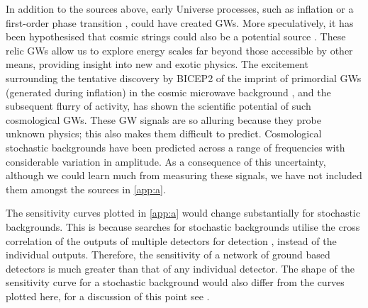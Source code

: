 In addition to the sources above, early Universe processes, such as inflation \citep{Grishchuk2005} or a first-order phase transition \citep{Binetruy2012}, could have created GWs. More speculatively, it has been hypothesised that cosmic strings could also be a potential source \citep{Damour2005,Binetruy2012,Aasi2014}. These relic GWs allow us to explore energy scales far beyond those accessible by other means, providing insight into new and exotic physics. The excitement surrounding the tentative discovery by BICEP2 of the imprint of primordial GWs (generated during inflation) in the cosmic microwave background \citep{Ade2014}, and the subsequent flurry of activity, has shown the scientific potential of such cosmological GWs. These GW signals are so alluring because they probe unknown physics; this also makes them difficult to predict. Cosmological stochastic backgrounds have been predicted across a range of frequencies with considerable variation in amplitude. As a consequence of this uncertainty, although we could learn much from measuring these signals, we have not included them amongst the sources in \ref{app:a}.

The sensitivity curves plotted in \ref{app:a} would change substantially for stochastic backgrounds. This is because searches for stochastic backgrounds utilise the cross correlation of the outputs of multiple detectors for detection \citep{1999PhRvD..59j2001A,2000PhR...331..283M}, instead of the individual outputs. Therefore, the sensitivity of a network of ground based detectors is much greater than that of any individual detector. The shape of the sensitivity curve for a stochastic background would also differ from the curves plotted here, for a discussion of this point see \cite{2013PhRvD..88l4032T}.

